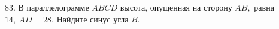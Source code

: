 83. В параллелограмме $ABCD$ высота, опущенная на сторону $AB,$ равна $14,\ AD=28.$ Найдите синус угла $B.$\\
